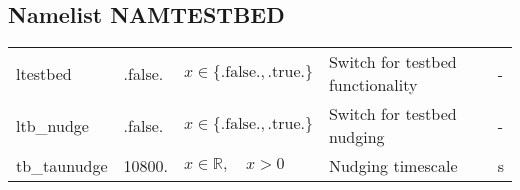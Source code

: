 \documentclass[twoside,11pt,fleqn,a4paper,english,openright]{report}
\begin{document}
\subsection{Namelist NAMTESTBED}\label{par:testbed}
\begin{center}
  \tablelasttail{
        &&&&\\\hline
  }
\begin{supertabular}{|l|p{2cm}|p{4cm}|p{6cm}|l|}
  ltestbed	& .false.	& $x\in\{\text{.false.},\text{.true.}\}$	& Switch for testbed functionality		& -\\
  ltb\_nudge	& .false.	& $x\in\{\text{.false.},\text{.true.}\}$	& Switch for testbed nudging		& -\\
  tb\_taunudge & 10800.	& $x \in \mathbb{R}, \quad x > 0$			& Nudging timescale					& s\\
\end{supertabular}
\end{center}

\end{document}
